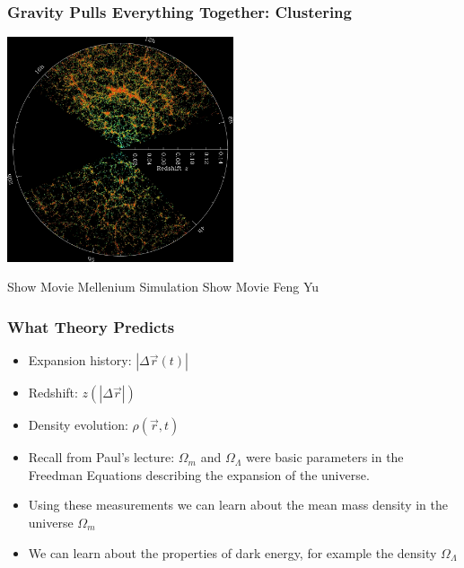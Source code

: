 \documentclass{beamer}
\begin{document}
\frame
{

    \frametitle{Gravity Pulls Everything Together: Clustering}



    \begin{center}
        \includegraphics[width=0.5\textwidth]{orangepie.jpg}
    \end{center}

    Show Movie Mellenium Simulation
    \newline
    Show Movie Feng Yu


}


\frame
{

    \frametitle{What Theory Predicts}


    \begin{itemize}

            

        \item Expansion history: {\color{gold} $|\Delta \vec{r} (t)|$ }


        \item Redshift: {\color{gold} $z(|\Delta \vec{r}|)$}


        \item Density evolution: {\color{gold} $\rho(\vec{r},t)$}

        \item Recall from Paul's lecture: {\color{gold} $\Omega_m$} and
            {\color{gold} $\Omega_\Lambda$} were basic parameters in the
            Freedman Equations describing the expansion of the universe.


        \item Using these measurements we can learn about the mean mass density in
            the universe {\color{gold} $\Omega_m$}
            
        \item We can learn about the properties of dark energy, for example
            the density {\color{gold} $\Omega_\Lambda$}



    \end{itemize}

}
\end{document}
